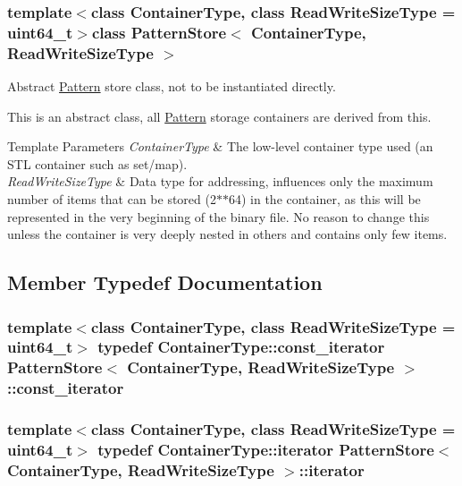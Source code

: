 \subsubsection*{template$<$class Container\+Type, class Read\+Write\+Size\+Type = uint64\+\_\+t$>$class Pattern\+Store$<$ Container\+Type, Read\+Write\+Size\+Type $>$}

Abstract \hyperlink{classPattern}{Pattern} store class, not to be instantiated directly. 

This is an abstract class, all \hyperlink{classPattern}{Pattern} storage containers are derived from this. 
\begin{DoxyTemplParams}{Template Parameters}
{\em Container\+Type} & The low-\/level container type used (an S\+T\+L container such as set/map). \\
\hline
{\em Read\+Write\+Size\+Type} & Data type for addressing, influences only the maximum number of items that can be stored (2$\ast$$\ast$64) in the container, as this will be represented in the very beginning of the binary file. No reason to change this unless the container is very deeply nested in others and contains only few items. \\
\hline
\end{DoxyTemplParams}


\subsection{Member Typedef Documentation}
\hypertarget{classPatternStore_a7d9724742a6e593e6d970bcd5540c6aa}{}
\subsubsection[{const\+\_\+iterator}]{\setlength{\rightskip}{0pt plus 5cm}template$<$class Container\+Type, class Read\+Write\+Size\+Type = uint64\+\_\+t$>$ typedef Container\+Type\+::const\+\_\+iterator {\bf Pattern\+Store}$<$ Container\+Type, Read\+Write\+Size\+Type $>$\+::{\bf const\+\_\+iterator}}\label{classPatternStore_a7d9724742a6e593e6d970bcd5540c6aa}
\hypertarget{classPatternStore_a2bcb8a35edcee7c35eb125ea3d2655ae}{}
\subsubsection[{iterator}]{\setlength{\rightskip}{0pt plus 5cm}template$<$class Container\+Type, class Read\+Write\+Size\+Type = uint64\+\_\+t$>$ typedef Container\+Type\+::iterator {\bf Pattern\+Store}$<$ Container\+Type, Read\+Write\+Size\+Type $>$\+::{\bf iterator}}\label{classPatternStore_a2bcb8a35edcee7c35eb125ea3d2655ae}


